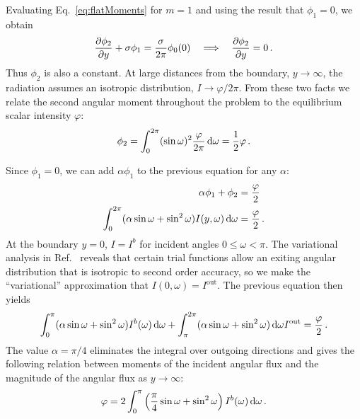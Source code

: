Evaluating Eq.~\eqref{eq:flatMoments} for $m=1$ and using the result that
$\phi_{1}=0$, we obtain
\begin{equation*}
  \frac{\partial \phi_{2}}{\partial y}
  + \sigma \phi_{1}
  = \frac{\sigma}{2\pi} \phi_{0} (0)
  \quad \Longrightarrow \quad
  \frac{\partial \phi_{2}}{\partial y} = 0\,.
\end{equation*}
Thus $\phi_{2}$ is also a constant. At large distances from the boundary,
$y\to\infty$, the radiation assumes an isotropic distribution,
$I\to\varphi/2\pi$. From these two facts we relate the second angular moment
throughout the problem to the equilibrium scalar intensity $\varphi$:
\begin{equation*}
  \phi_{2} = \int_{0}^{2\pi} (\sin\omega)^2 \frac{\varphi}{2\pi} \mathop{}\!\mathrm{d}\omega
  = \frac{1}{2} \varphi\,.
\end{equation*}

Since $\phi_1=0$, we can add $\alpha \phi_1$ to the previous equation for any
$\alpha$:
\begin{align*}
 \alpha\phi_1 + \phi_{2} &= \frac{\varphi}{2} \\
 \int_{0}^{2\pi} (\alpha \sin\omega + \sin^2\omega)
 I(y,\omega) \mathop{}\!\mathrm{d}\omega
 &= \frac{\varphi}{2}\,.
\end{align*}
At the boundary $y=0$, $I=I^b$ for incident angles $0 \le \omega < \pi$.
The variational analysis in Ref.~\cite{Mal1991} reveals that certain trial functions
allow an exiting angular distribution that is isotropic to second order accuracy,
so we make the ``variational'' approximation that $I(0,\omega)=I^\text{out}$.
The previous equation then yields
\begin{equation*}
 \int_{0}^{\pi} (\alpha \sin\omega + \sin^2\omega)
 I^b(\omega) \mathop{}\!\mathrm{d}\omega
 + \int_{\pi}^{2\pi} (\alpha \sin\omega + \sin^2\omega)\mathop{}\!\mathrm{d}\omega I^\text{out}
 = \frac{\varphi}{2}\,.
\end{equation*}
The value $\alpha=\pi/4$ eliminates the integral over outgoing directions and
gives the following relation between moments of the incident angular flux and the
magnitude of the angular flux as $y\to\infty$:
\begin{equation}\label{eq:varBoundary}
 \varphi = 2\int_{0}^{\pi} \left( \frac{\pi}{4} \sin\omega + \sin^2\omega \right)
 I^b(\omega) \mathop{}\!\mathrm{d}\omega
 \,.
\end{equation}

